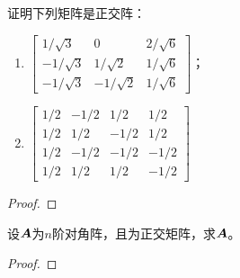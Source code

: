 \begin{problem}\label{problem-2.51}
证明下列矩阵是正交阵：
\begin{enumerate}
    \item \(\begin{bmatrix}
              1/\sqrt{3}  & 0           & 2/\sqrt{6} \\
              -1/\sqrt{3} & 1/\sqrt{2}  & 1/\sqrt{6} \\
              -1/\sqrt{3} & -1/\sqrt{2} & 1/\sqrt{6}
          \end{bmatrix}\)；
    \item \(\begin{bmatrix}
              1/2 & -1/2 & 1/2  & 1/2  \\
              1/2 & 1/2  & -1/2 & 1/2  \\
              1/2 & -1/2 & -1/2 & -1/2 \\
              1/2 & 1/2  & 1/2  & -1/2
          \end{bmatrix}\)
\end{enumerate}
\end{problem}
\begin{proof}
\end{proof}

\begin{problem}\label{problem-2.52}
设\(\boldsymbol{A}\)为\(n\)阶对角阵，且为正交矩阵，求\(\boldsymbol{A}\)。
\end{problem}
\begin{proof}
\end{proof}